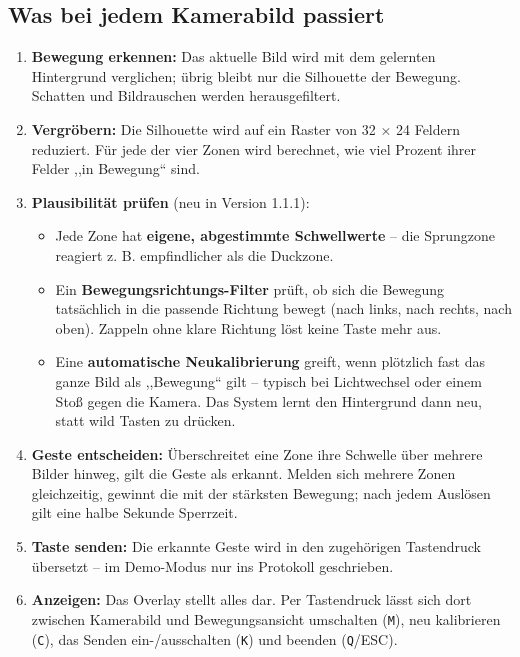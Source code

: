 \documentclass[12pt,a4paper]{article}
\newcommand{\code}[1]{\texttt{#1}}
\begin{document}
\subsection{Was bei jedem Kamerabild passiert}

\begin{enumerate}[leftmargin=*]
    \item \textbf{Bewegung erkennen:} Das aktuelle Bild wird mit dem gelernten Hintergrund verglichen; übrig bleibt nur die Silhouette der Bewegung. Schatten und Bildrauschen werden herausgefiltert.
    \item \textbf{Vergröbern:} Die Silhouette wird auf ein Raster von 32 $\times$ 24 Feldern reduziert. Für jede der vier Zonen wird berechnet, wie viel Prozent ihrer Felder ,,in Bewegung`` sind.
    \item \textbf{Plausibilität prüfen} (neu in Version 1.1.1):
    \begin{itemize}[leftmargin=*]
        \item Jede Zone hat \textbf{eigene, abgestimmte Schwellwerte} -- die Sprungzone reagiert z. B. empfindlicher als die Duckzone.
        \item Ein \textbf{Bewegungsrichtungs-Filter} prüft, ob sich die Bewegung tatsächlich in die passende Richtung bewegt (nach links, nach rechts, nach oben). Zappeln ohne klare Richtung löst keine Taste mehr aus.
        \item Eine \textbf{automatische Neukalibrierung} greift, wenn plötzlich fast das ganze Bild als ,,Bewegung`` gilt -- typisch bei Lichtwechsel oder einem Stoß gegen die Kamera. Das System lernt den Hintergrund dann neu, statt wild Tasten zu drücken.
    \end{itemize}
    \item \textbf{Geste entscheiden:} Überschreitet eine Zone ihre Schwelle über mehrere Bilder hinweg, gilt die Geste als erkannt. Melden sich mehrere Zonen gleichzeitig, gewinnt die mit der stärksten Bewegung; nach jedem Auslösen gilt eine halbe Sekunde Sperrzeit.
    \item \textbf{Taste senden:} Die erkannte Geste wird in den zugehörigen Tastendruck übersetzt -- im Demo-Modus nur ins Protokoll geschrieben.
    \item \textbf{Anzeigen:} Das Overlay stellt alles dar. Per Tastendruck lässt sich dort zwischen Kamerabild und Bewegungsansicht umschalten (\code{M}), neu kalibrieren (\code{C}), das Senden ein-/ausschalten (\code{K}) und beenden (\code{Q}/ESC).
\end{enumerate}
\end{document}
